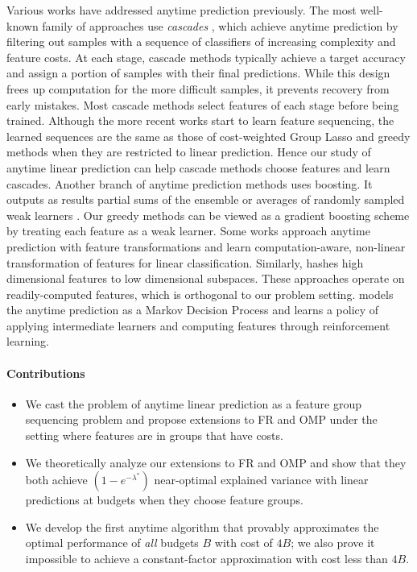 Various works have addressed anytime prediction previously. 
The most well-known family of approaches 
use \textit{cascades} \citep{cascade}, which achieve 
anytime prediction by filtering out samples 
with a sequence of classifiers of increasing complexity 
and feature costs. 
At each stage, cascade methods 
\citep{sochman:05, brubaker:07, lefakis:10, xu:14, cai:15} 
typically achieve a target accuracy and assign a portion of samples
with their final predictions. While this design frees up computation for 
the more difficult samples, it prevents recovery from early 
mistakes. Most cascade methods select features of each 
stage before being trained. Although the more recent works start to learn feature sequencing, the learned sequences
are the same as those of cost-weighted Group Lasso \citep{chen:12} 
and greedy methods \citep{cai:15} when they are 
restricted to linear prediction. Hence our study of anytime 
linear prediction can help cascade methods choose features and
learn cascades. 
Another branch of anytime prediction methods uses boosting. It outputs as results partial sums of the ensemble \citep{speedboost} or averages of randomly sampled weak learners \citep{reyzin:11}. Our greedy methods can be 
viewed as a gradient boosting scheme by treating each feature 
as a weak learner. 
Some works approach anytime prediction with feature transformations \citep{xu:12, xu:13b} and learn computation-aware, non-linear transformation of features for linear classification. Similarly, \cite{weinberger09feature} hashes high dimensional features to low dimensional subspaces. These approaches operate on readily-computed features, which is orthogonal to our problem setting. 
\cite{timeliness} models the anytime prediction as a Markov Decision Process and learns a policy of applying intermediate learners and computing features through reinforcement learning.

\paragraph*{Contributions}
\begin{itemize}[leftmargin=*]
\setlength\itemsep{1em}
\item We cast the problem of anytime linear prediction 
as a feature group sequencing problem  
and propose extensions to FR and OMP under the setting where features are in
groups that have costs. 
\item We theoretically analyze our extensions to FR and OMP 
and show that they both achieve $(1-e^{-\lambda^*})$ near-optimal 
explained variance with linear predictions at budgets when 
they choose feature groups.
\item We develop the first anytime algorithm 
that provably approximates the optimal performance
of \textit{all} budgets $B$ with cost of $4B$; we also prove it 
impossible to achieve a constant-factor approximation with cost less than $4B$. 
\end{itemize}






